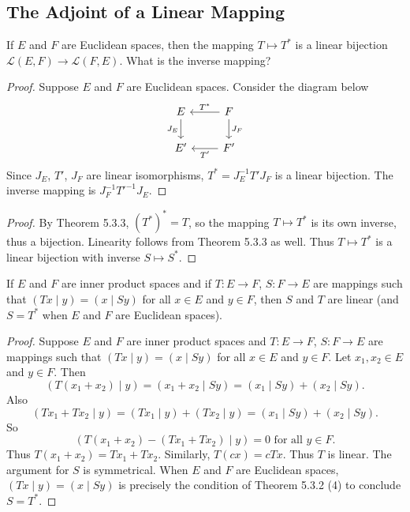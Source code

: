 \subsection{The Adjoint of a Linear Mapping}

\begin{tcolorbox}[title=Problem 2, breakable]
    If $E$ and $F$ are Euclidean spaces, 
    then the mapping $T \mapsto T^*$ 
    is a linear bijection $\mathcal{L}(E,F) \to \mathcal{L}(F,E)$. 
    What is the inverse mapping?
\end{tcolorbox}

\begin{proof}
    Suppose $E$ and $F$ are Euclidean spaces. Consider the diagram below
    \[
        \begin{tikzcd}
        E \arrow[d, "J_E"'] & F \arrow[l, "T^*"'] \arrow[d, "J_F"] \\
        E' & F' \arrow[l, "T'"]
        \end{tikzcd}
    \]
    Since $J_E$, $T'$, $J_F$ are linear isomorphisms, 
    $T^* = J_E^{-1} T' J_F$ is a linear bijection. 
    The inverse mapping is $J^{-1} _FT'^{-1} J_E$.
\end{proof}

\begin{proof}
    By Theorem 5.3.3, $(T^*)^* = T$, so the mapping $T \mapsto T^*$ is its own inverse, thus a bijection. Linearity follows from Theorem 5.3.3 as well. Thus $T \mapsto T^*$ is a linear bijection with inverse $S \mapsto S^*$.
\end{proof}

\begin{tcolorbox}[title=Problem 3, breakable]
    If $E$ and $F$ are inner product spaces 
        and if $T:E \to F$, $S:F \to E$ 
        are mappings such that $(Tx \mid y) = (x \mid Sy)$ 
        for all $x \in E$ and $y \in F$, 
        then $S$ and $T$ are linear
         (and $S = T^*$ when $E$ and $F$ are Euclidean spaces).
\end{tcolorbox}

\begin{proof}
    Suppose $E$ and $F$ are inner product spaces
    and $T:E \to F$, $S:F \to E$
    are mappings such that $(Tx \mid y) = (x \mid Sy)$
    for all $x \in E$ and $y \in F$.
    Let $x_1, x_2 \in E$ and $y \in F$.
    Then
    \[(T(x_1 + x_2) \mid y) = (x_1 + x_2 \mid Sy) = (x_1 \mid Sy) + (x_2 \mid Sy).\]
    Also
    \[(Tx_1 + Tx_2 \mid y) = (Tx_1 \mid y) + (Tx_2 \mid y) = (x_1 \mid Sy) + (x_2 \mid Sy).\]
    So
    \[(T(x_1 + x_2) - (Tx_1 + Tx_2) \mid y) = 0 \text{ for all } y \in F.\]
    Thus $T(x_1 + x_2) = Tx_1 + Tx_2$. Similarly, $T(cx) = cTx$. Thus $T$ is linear.
    The argument for $S$ is symmetrical. When $E$ and $F$ are Euclidean spaces,
    $(Tx \mid y) = (x \mid Sy)$ is precisely the condition of Theorem 5.3.2 (4) to conclude $S = T^*$.
\end{proof}


